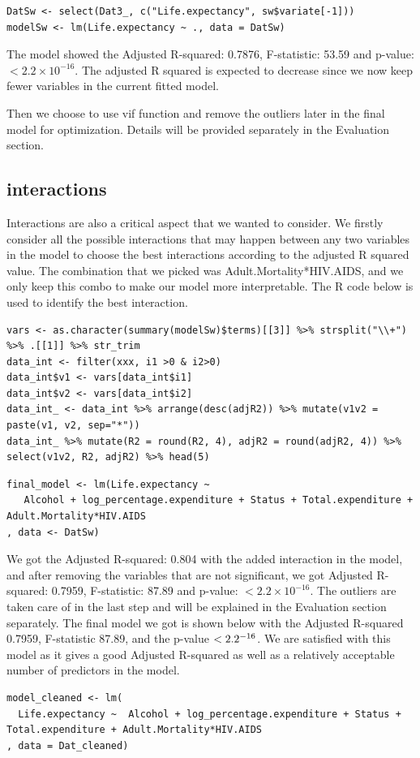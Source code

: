 \begin{verbatim}
DatSw <- select(Dat3_, c("Life.expectancy", sw$variate[-1]))
modelSw <- lm(Life.expectancy ~ ., data = DatSw)
\end{verbatim}

The model showed the Adjusted R-squared:  0.7876, F-statistic: 53.59 and p-value: $< 2.2\times 10^{-16}$. The adjusted R squared is expected to decrease since we now keep fewer variables in the current fitted model.

Then we choose to use vif function and remove the outliers later in the final model for optimization. Details will be provided separately in the Evaluation section. 

\subsection{interactions}

Interactions are also a critical aspect that we wanted to consider. We firstly consider all the possible interactions that may happen between any two variables in the model to choose the best interactions according to the adjusted R squared value. The combination that we picked was Adult.Mortality*HIV.AIDS, and we only keep this combo to make our model more interpretable. The R code below is used to identify the best interaction.

\begin{verbatim}
vars <- as.character(summary(modelSw)$terms)[[3]] %>% strsplit("\\+") %>% .[[1]] %>% str_trim
data_int <- filter(xxx, i1 >0 & i2>0)
data_int$v1 <- vars[data_int$i1]
data_int$v2 <- vars[data_int$i2]
data_int_ <- data_int %>% arrange(desc(adjR2)) %>% mutate(v1v2 = paste(v1, v2, sep="*")) 
data_int_ %>% mutate(R2 = round(R2, 4), adjR2 = round(adjR2, 4)) %>% select(v1v2, R2, adjR2) %>% head(5) 
\end{verbatim}

\begin{verbatim}
final_model <- lm(Life.expectancy ~ 
   Alcohol + log_percentage.expenditure + Status + Total.expenditure + Adult.Mortality*HIV.AIDS
, data <- DatSw)
\end{verbatim}

We got the Adjusted R-squared: 0.804 with the added interaction in the model, and after removing the variables that are not significant, we got Adjusted R-squared: 0.7959, F-statistic: 87.89 and p-value: $< 2.2\times 10^{-16}$. The outliers are taken care of in the last step and will be explained in the Evaluation section separately. The final model we got is shown below with the Adjusted R-squared 0.7959, F-statistic 87.89, and the p-value $< 2.2\time 10^{-16}$. We are satisfied with this model as it gives a good Adjusted R-squared as well as a relatively acceptable number of predictors in the model.

\begin{verbatim}
model_cleaned <- lm(
  Life.expectancy ~  Alcohol + log_percentage.expenditure + Status + Total.expenditure + Adult.Mortality*HIV.AIDS
, data = Dat_cleaned)
\end{verbatim}

